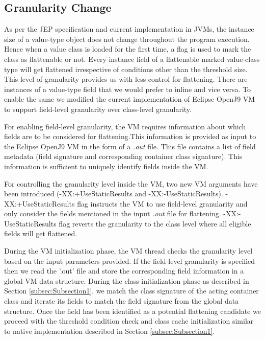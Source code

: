 \documentclass[12 pt, a4paper]{article}
\begin{document}
\subsection{Granularity Change}
As per the JEP \citep{JEPP} specification and current implementation in JVMs, the instance size of a value-type object does not
change throughout the program execution. Hence when a value class is loaded for the first time, a flag is used to mark the class as flattenable or not.
Every instance field of a flattenable marked value-class type will get flattened irrespective of conditions other than the threshold size.
This level of granularity provides us with less control for flattening. There are instances of a value-type field that we
would prefer to inline and vice versa. To enable the same we modified the current implementation of Eclipse OpenJ9 VM to support field-level granularity over class-level granularity. 


For enabling field-level granularity, the VM requires information about which fields are to be considered for
flattening.This information is provided as input to the Eclipse OpenJ9 VM in the form of a {\em .out} file. This file contains a list 
of field metadata (field signature and corresponding container class signature). This information is sufficient to uniquely 
identify fields inside the VM.

For controlling the granularity level inside the VM, two new VM arguments have been introduced 
(-XX:+UseStaticResults and -XX:-UseStaticResults). -XX:+UseStaticResults flag 
instructs the VM to use field-level granularity and only consider the fields mentioned in the input {\em .out} file for flattening.
-XX:-UseStaticResults flag reverts the granularity to the class level where all eligible fields will get flattened.

During the VM initialization phase, the VM thread checks the granularity level based on the input parameters provided.
If the field-level granularity is specified then we read the '.out' file and store the corresponding field information in a 
global VM data structure. During the class initialization phase as described in Section \ref{subsec:Subsection1}, we match the class signature of the
acting container class and iterate its fields to match the field signature from the global data structure.
Once the field has been identified as a potential flattening candidate we proceed with the threshold condition check and 
class cache initialization similar to native implementation described in Section \ref{subsec:Subsection1}.
\end{document}
